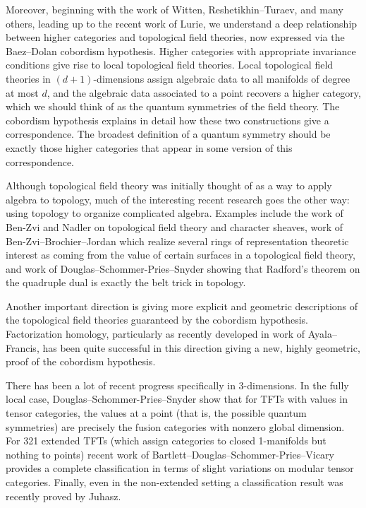 \documentclass[12pt]{article}
\begin{document}
Moreover, beginning with the work of Witten, Reshetikhin--Turaev, and many others, leading up to the recent work of Lurie, we understand a deep relationship between higher categories and topological field theories, now expressed via the Baez--Dolan cobordism hypothesis. Higher categories with appropriate invariance conditions give rise to local topological field theories. Local topological field theories in $(d+1)$-dimensions assign algebraic data to all manifolds of degree at most $d$, and the algebraic data associated to a point recovers a higher category, which we should think of as the quantum symmetries of the field theory. The cobordism hypothesis explains in detail how these two constructions give a correspondence. The broadest definition of a quantum symmetry should be exactly those higher categories that appear in some version of this correspondence.

Although topological field theory was initially thought of as a way to apply algebra to topology, much of the interesting recent research goes the other way: using topology to organize complicated algebra. Examples include the work of Ben-Zvi and Nadler on topological field theory and character sheaves, work of Ben-Zvi--Brochier--Jordan which realize several rings of representation theoretic interest as coming from the value of certain surfaces in a topological field theory, and work of Douglas--Schommer-Pries--Snyder showing that Radford's theorem on the quadruple dual is exactly the belt trick in topology.

Another important direction is giving more explicit and geometric descriptions of the topological field theories guaranteed by the cobordism hypothesis. Factorization homology, particularly as recently developed in work of Ayala--Francis, has been quite successful in this direction giving a new, highly geometric, proof of the cobordism hypothesis.

There has been a lot of recent progress specifically in $3$-dimensions. In the fully local case, Douglas--Schommer-Pries--Snyder show that for TFTs with values in tensor categories, the values at a point (that is, the possible quantum symmetries) are precisely the fusion categories with nonzero global dimension. For 321 extended TFTs (which assign categories to closed 1-manifolds but nothing to points) recent work of Bartlett--Douglas--Schommer-Pries--Vicary provides a complete classification in terms of slight variations on modular tensor categories.  Finally, even in the non-extended setting a classification result was recently proved by Juhasz.
\end{document}
